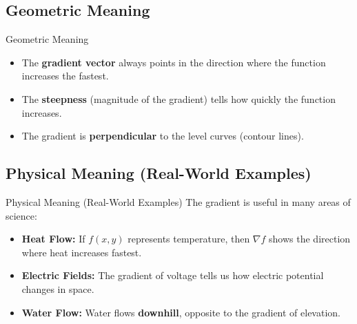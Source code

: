 \documentclass{beamer}
\begin{document}
\subsection{Geometric Meaning}

\begin{frame}{Geometric Meaning}
    \begin{itemize}
        \item The \textbf{gradient vector} always points in the direction where the function increases the fastest.
        \item The \textbf{steepness} (magnitude of the gradient) tells how quickly the function increases.
        \item The gradient is \textbf{perpendicular} to the level curves (contour lines).
    \end{itemize}
\end{frame}

\subsection{Physical Meaning (Real-World Examples)}
\begin{frame}{Physical Meaning (Real-World Examples)}
    The gradient is useful in many areas of science:
    \begin{itemize}
        \item \textbf{Heat Flow:} If \( f(x, y) \) represents temperature, then \( \nabla f \) shows the direction where heat increases fastest.
        \item \textbf{Electric Fields:} The gradient of voltage tells us how electric potential changes in space.
        \item \textbf{Water Flow:} Water flows \textbf{downhill}, opposite to the gradient of elevation.
    \end{itemize}
    
    \centering

\end{frame}
\end{document}
